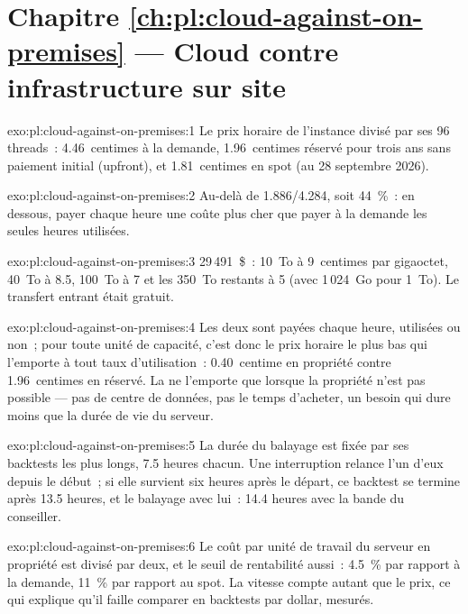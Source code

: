 \section*{Chapitre \ref{ch:pl:cloud-against-on-premises} --- Cloud contre infrastructure sur site}

\begin{solution}{exo:pl:cloud-against-on-premises:1}
Le prix horaire de l'instance divisé par ses 96 threads~: 4.46~centimes à la demande, 1.96~centimes réservé pour trois ans sans paiement initial (upfront), et
1.81~centimes en spot (au 28 septembre 2026).
\end{solution}

\begin{solution}{exo:pl:cloud-against-on-premises:2}
Au-delà de 1.886/4.284, soit 44~\%~: en dessous, payer chaque heure une  coûte plus cher que payer à la demande les seules heures utilisées.
\end{solution}

\begin{solution}{exo:pl:cloud-against-on-premises:3}
29\,491~\$~: 10~To à 9~centimes par gigaoctet, 40~To à 8.5, 100~To à 7 et les 350~To restants à 5 (avec 1\,024~Go pour 1~To). Le transfert entrant
était gratuit.
\end{solution}

\begin{solution}{exo:pl:cloud-against-on-premises:4}
Les deux sont payées chaque heure, utilisées ou non~; pour toute unité de capacité, c'est donc le prix horaire le plus bas qui l'emporte à tout taux d'utilisation~: 0.40~centime en propriété
contre 1.96~centimes en réservé. La  ne l'emporte que lorsque la propriété n'est pas possible --- pas de centre de données, pas le temps d'acheter, un besoin qui dure moins que
la durée de vie du serveur.
\end{solution}

\begin{solution}{exo:pl:cloud-against-on-premises:5}
La durée du balayage est fixée par ses backtests les plus longs, 7.5 heures chacun. Une interruption relance l'un d'eux depuis le début~; si elle survient six heures
après le départ, ce backtest se termine après 13.5 heures, et le balayage avec lui~: 14.4 heures avec la bande du conseiller.
\end{solution}

\begin{solution}{exo:pl:cloud-against-on-premises:6}
Le coût par unité de travail du serveur en propriété est divisé par deux, et le seuil de rentabilité aussi~: 4.5~\% par rapport à la demande, 11~\% par rapport au spot. La vitesse compte autant
que le prix, ce qui explique qu'il faille comparer en backtests par dollar, mesurés.
\end{solution}

